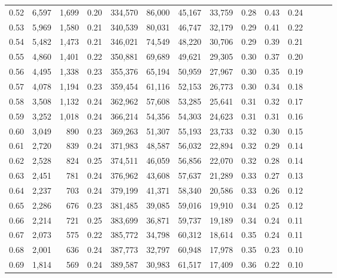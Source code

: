 \begin{tabular}{rrrrrrrrrrrrrr}
0.52 &   6,597 &  1,699 &  0.20 &  334,570 &   86,000 &  45,167 &  33,759 &  0.28 &  0.43 &      0.24 \\
0.53 &   5,969 &  1,580 &  0.21 &  340,539 &   80,031 &  46,747 &  32,179 &  0.29 &  0.41 &      0.22 \\
0.54 &   5,482 &  1,473 &  0.21 &  346,021 &   74,549 &  48,220 &  30,706 &  0.29 &  0.39 &      0.21 \\
0.55 &   4,860 &  1,401 &  0.22 &  350,881 &   69,689 &  49,621 &  29,305 &  0.30 &  0.37 &      0.20 \\
0.56 &   4,495 &  1,338 &  0.23 &  355,376 &   65,194 &  50,959 &  27,967 &  0.30 &  0.35 &      0.19 \\
0.57 &   4,078 &  1,194 &  0.23 &  359,454 &   61,116 &  52,153 &  26,773 &  0.30 &  0.34 &      0.18 \\
0.58 &   3,508 &  1,132 &  0.24 &  362,962 &   57,608 &  53,285 &  25,641 &  0.31 &  0.32 &      0.17 \\
0.59 &   3,252 &  1,018 &  0.24 &  366,214 &   54,356 &  54,303 &  24,623 &  0.31 &  0.31 &      0.16 \\
0.60 &   3,049 &    890 &  0.23 &  369,263 &   51,307 &  55,193 &  23,733 &  0.32 &  0.30 &      0.15 \\
0.61 &   2,720 &    839 &  0.24 &  371,983 &   48,587 &  56,032 &  22,894 &  0.32 &  0.29 &      0.14 \\
0.62 &   2,528 &    824 &  0.25 &  374,511 &   46,059 &  56,856 &  22,070 &  0.32 &  0.28 &      0.14 \\
0.63 &   2,451 &    781 &  0.24 &  376,962 &   43,608 &  57,637 &  21,289 &  0.33 &  0.27 &      0.13 \\
0.64 &   2,237 &    703 &  0.24 &  379,199 &   41,371 &  58,340 &  20,586 &  0.33 &  0.26 &      0.12 \\
0.65 &   2,286 &    676 &  0.23 &  381,485 &   39,085 &  59,016 &  19,910 &  0.34 &  0.25 &      0.12 \\
0.66 &   2,214 &    721 &  0.25 &  383,699 &   36,871 &  59,737 &  19,189 &  0.34 &  0.24 &      0.11 \\
0.67 &   2,073 &    575 &  0.22 &  385,772 &   34,798 &  60,312 &  18,614 &  0.35 &  0.24 &      0.11 \\
0.68 &   2,001 &    636 &  0.24 &  387,773 &   32,797 &  60,948 &  17,978 &  0.35 &  0.23 &      0.10 \\
0.69 &   1,814 &    569 &  0.24 &  389,587 &   30,983 &  61,517 &  17,409 &  0.36 &  0.22 &      0.10 \\

\end{tabular}
